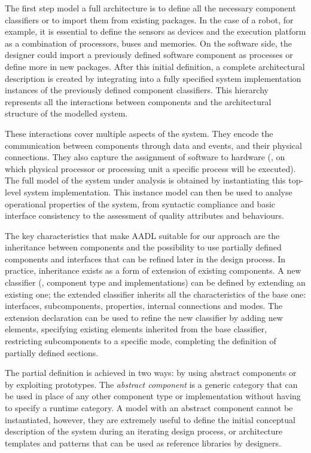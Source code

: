 The first step model a full architecture is to define all the necessary component classifiers or to import them from existing packages. In the case of a robot, for example, it is essential to define the sensors as devices and the execution platform as a combination of processors, buses and memories. On the software side, the designer could import a previously defined software component as processes or define more in new packages. After this initial definition, a complete architectural description is created by integrating into a fully specified system implementation instances of the previously defined component classifiers. This hierarchy represents all the interactions between components and the architectural structure of the modelled system.

These interactions cover multiple aspects of the system. They encode the communication between components through data and events, and their physical connections. They also capture the assignment of software to hardware (\eg, on which physical processor or processing unit a specific process will be executed). The full model of the system under analysis is obtained by instantiating this top-level system implementation. This instance model can then be used to analyse operational properties of the system, from syntactic compliance and basic interface consistency to the assessment of quality attributes and behaviours.

The key characteristics that make AADL suitable for our approach are the inheritance between components and the possibility to use partially defined components and interfaces that can be refined later in the design process. In practice, inheritance exists as a form of extension of existing components. A new classifier (\ie, component type and implementations) can be defined by extending an existing one; the extended classifier inherits all the characteristics of the base one: interfaces, subcomponents, properties, internal connections and modes. The extension declaration can be used to refine the new classifier by adding new elements, specifying existing elements inherited from the base classifier, restricting subcomponents to a specific mode, completing the definition of partially defined sections. 

The partial definition is achieved in two ways: by using abstract components or by exploiting prototypes. The \textit{abstract component} is a generic category that can be used in place of any other component type or implementation without having to specify a runtime category. A model with an abstract component cannot be instantiated, however, they are extremely useful to define the initial conceptual description of the system during an iterating design process, or architecture templates and patterns that can be used as reference libraries by designers.

